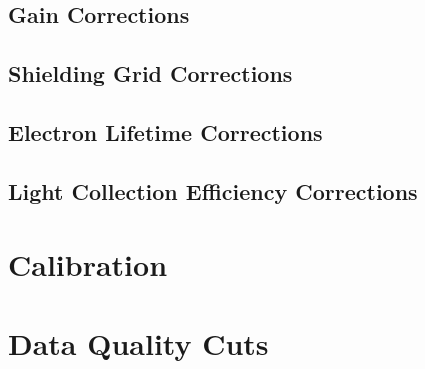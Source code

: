 \documentclass[herrin-thesis.tex]{subfiles}
\begin{document}
\subsection{Gain Corrections}
\subsection{Shielding Grid Corrections}
\subsection{Electron Lifetime Corrections}
\subsection{Light Collection Efficiency Corrections}

\section{Calibration}

\section{Data Quality Cuts}
\end{document}
